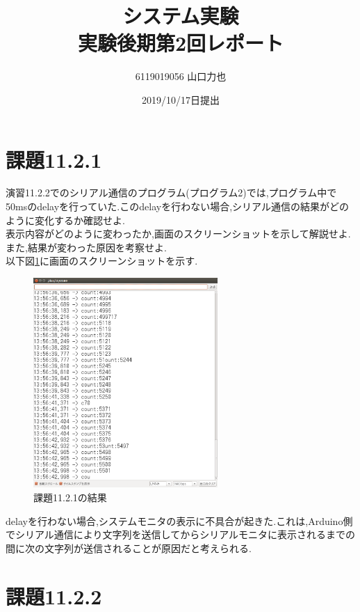 \documentclass{jarticle}
\title{{システム実験}\\実験後期第2回レポート}
\author{6119019056 山口力也}
\date{2019/10/17日提出}
\begin{document}
\maketitle
\section{課題11.2.1}
演習11.2.2でのシリアル通信のプログラム(プログラム2)では,プログラム中で50msのdelayを行っていた.このdelayを行わない場合,シリアル通信の結果がどのように変化するか確認せよ. \\
表示内容がどのように変わったか,画面のスクリーンショットを示して解説せよ.また,結果が変わった原因を考察せよ. \\
以下図\ref{fig:kadai11-2-1}に画面のスクリーンショットを示す.

\begin{figure}[H]
\begin{center}
\includegraphics[width=7.0cm]{images/kadai11-2-1.png}
\caption{課題11.2.1の結果}
\label{fig:kadai11-2-1}
\end{center}
\end{figure}

delayを行わない場合,システムモニタの表示に不具合が起きた.これは,Arduino側でシリアル通信により文字列を送信してからシリアルモニタに表示されるまでの間に次の文字列が送信されることが原因だと考えられる.

\section{課題11.2.2}
\end{document}
